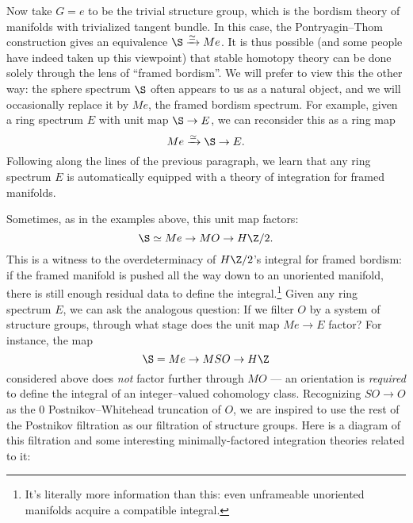Now take $G = e$ to be the trivial structure group, which is the bordism theory of manifolds with trivialized tangent bundle.  In this case, the Pontryagin--Thom construction gives an equivalence $\S \xrightarrow{\simeq} Me$.  It is thus possible (and some people have indeed taken up this viewpoint) that stable homotopy theory can be done solely through the lens of ``framed bordism''.  We will prefer to view this the other way: the sphere spectrum $\S$ often appears to us as a natural object, and we will occasionally replace it by $Me$, the framed bordism spectrum.  For example, given a ring spectrum $E$ with unit map $\S \to E$, we can reconsider this as a ring map \[Me \xrightarrow{\simeq} \S \to E.\]  Following along the lines of the previous paragraph, we learn that any ring spectrum $E$ is automatically equipped with a theory of integration for framed manifolds.

Sometimes, as in the examples above, this unit map factors: \[\S \simeq Me \to MO \to H\Z/2.\]  This is a witness to the overdeterminacy of $H\Z/2$'s integral for framed bordism: if the framed manifold is pushed all the way down to an unoriented manifold, there is still enough residual data to define the integral.\footnote{It's literally more information than this: even unframeable unoriented manifolds acquire a compatible integral.}  Given any ring spectrum $E$, we can ask the analogous question: If we filter $O$ by a system of structure groups, through what stage does the unit map $Me \to E$ factor?  For instance, the map \[\S = Me \to MSO \to H\Z\] considered above does \emph{not} factor further through $MO$ --- an orientation is \emph{required} to define the integral of an integer--valued cohomology class.  Recognizing $SO \to O$ as the $0${\th} Postnikov--Whitehead truncation of $O$, we are inspired to use the rest of the Postnikov filtration as our filtration of structure groups.  Here is a diagram of this filtration and some interesting minimally-factored integration theories related to it:
\begin{center}
\end{center}

